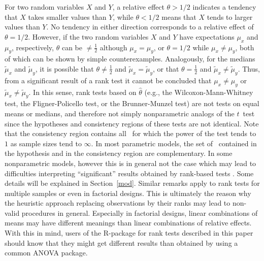 For two random variables $X$ and $Y$, a relative effect $\theta>1/2$ indicates 
a tendency that $X$ takes smaller values than $Y$, while $\theta <1/2$ means 
that $X$ tends to larger values than $Y$. No tendency in either direction 
corresponds to a relative effect of $\theta =1/2$. However, if the two random 
variables $X$ and $Y$ have expectations $\mu_x$ and $\mu_y$, respectively, 
$\theta$ can be $\neq \frac12$ although $\mu_x = \mu_y$, or $\theta = 1/2$ 
while $\mu_x \neq \mu_y$, both of which can be shown by simple counterexamples. 
Analogously, for the medians $\widetilde{\mu}_x$ and $\widetilde{\mu}_y$, it is 
possible that $\theta \neq \frac12$ and $\widetilde{\mu}_x = \widetilde{\mu}_y$,
or that $\theta = \frac12$ and $\widetilde{\mu}_x \neq \widetilde{\mu}_y$. 
Thus, from a significant result of a rank test it cannot be concluded that 
$\mu_x \neq \mu_y$ or $\widetilde{\mu}_x \neq \widetilde{\mu}_y$. In this 
sense, rank tests based on $\widehat{\theta}$ (e.g., the Wilcoxon-Mann-Whitney 
test, the Fligner-Policello test, or the Brunner-Munzel test) are not tests on 
equal means or medians, and therefore not simply nonparametric analogs of the 
$t$~test since the hypotheses and consistency regions of these tests are not 
identical. Note that the consistency region contains all \dfs\ for which the 
power of the test tends to $1$ as sample sizes tend to $\infty$. In most 
parametric models, the set of \dfs\ contained in the hypothesis and in the 
consistency region are complementary. In some nonparametric models, however 
this is in general not the case which may lead to difficulties interpreting 
``significant'' results obtained by rank-based tests \citep{brunner2020ranks}. 
Some details will be explained in Section~\ref{mod}. Similar remarks apply to 
rank tests for multiple samples or even in factorial designs. This is 
ultimately the reason why the heuristic approach \citep{conover1981rank} 
replacing observations by their ranks may lead to non-valid procedures in 
general. Especially in factorial designs, linear combinations of means may have 
different meanings than linear combinations of relative effects. With this in 
mind, users of the R-package for rank tests described in this paper 
should know that they might get different results than obtained by using a 
common ANOVA package.


